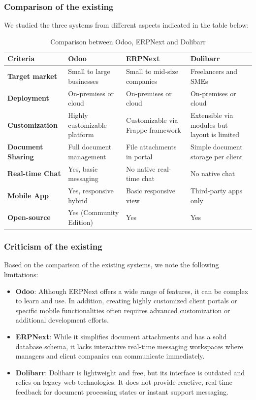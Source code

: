 \subsubsection{Comparison of the existing}
We studied the three systems from different aspects indicated in the table below:
\begin{table}[H]
\centering
\caption{Comparison between Odoo, ERPNext and Dolibarr}
\label{tab:comparison_existing}
\begin{tabular}{|l|p{3.8cm}|p{3.8cm}|p{3.8cm}|}
\hline
\textbf{Criteria} & \textbf{Odoo} & \textbf{ERPNext} & \textbf{Dolibarr} \\
\hline
\textbf{Target market} & Small to large businesses & Small to mid-size companies & Freelancers and SMEs \\
\hline
\textbf{Deployment} & On-premises or cloud & On-premises or cloud & On-premises or cloud \\
\hline
\textbf{Customization} & Highly customizable platform & Customizable via Frappe framework & Extensible via modules but layout is limited \\
\hline
\textbf{Document Sharing} & Full document management & File attachments in portal & Simple document storage per client \\
\hline
\textbf{Real-time Chat} & Yes, basic messaging & No native real-time chat & No native chat \\
\hline
\textbf{Mobile App} & Yes, responsive hybrid & Basic responsive view & Third-party apps only \\
\hline
\textbf{Open-source} & Yes (Community Edition) & Yes & Yes \\
\hline
\end{tabular}
\end{table}

\subsubsection{Criticism of the existing}
Based on the comparison of the existing systems, we note the following limitations:
\begin{itemize}
    \item \textbf{Odoo}: Although ERPNext offers a wide range of features, it can be complex to learn and use. In addition, creating highly customized client portals or specific mobile functionalities often requires advanced customization or additional development efforts.
    \item \textbf{ERPNext}: While it simplifies document attachments and has a solid database schema, it lacks interactive real-time messaging workspaces where managers and client companies can communicate immediately.
    \item \textbf{Dolibarr}: Dolibarr is lightweight and free, but its interface is outdated and relies on legacy web technologies. It does not provide reactive, real-time feedback for document processing states or instant support messaging.
\end{itemize}

